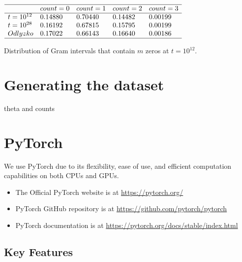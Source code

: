 \documentclass[journal]{IEEEtai}
\begin{document}
\begin{table}
\centering \(\begin{array}{lllll}\\
\hline
 &count = 0&count = 1&count = 2&count = 3\\
\hline
t = 10^{12}&0.14880&0.70440&0.14482&0.00199\\
t = 10^{28}&0.16192&0.67815&0.15795&0.00199\\
Odlyzko&0.17022&0.66143&0.16640&0.00186\\
\hline
\end{array}\)
\caption{Distribution of Gram intervals that contain $m$ zeros at  $t=10^{12}$.} 
\label{tab:intervalzeros}
\end{table}


\section{Generating the dataset}

theta and counts


\section{PyTorch}

We use PyTorch  due to its flexibility, ease of use, and efficient computation capabilities on both CPUs and GPUs.

\begin{itemize}
    \item The Official PyTorch website is at \url{https://pytorch.org/}
    \item PyTorch GitHub repository is at \url{https://github.com/pytorch/pytorch}
    \item PyTorch documentation is at \url{https://pytorch.org/docs/stable/index.html}
\end{itemize}

\subsection{Key Features}
\end{document}
